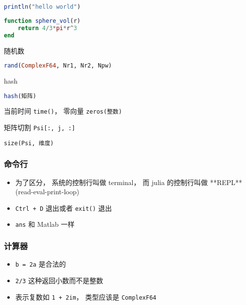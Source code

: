 
\begin{issues}
\issueDraft
\end{issues}

\begin{lstlisting}[language=julia]
println("hello world")
\end{lstlisting}

\begin{lstlisting}[language=julia]
function sphere_vol(r)
    return 4/3*pi*r^3
end
\end{lstlisting}

随机数
\begin{lstlisting}[language=julia]
rand(ComplexF64, Nr1, Nr2, Npw)
\end{lstlisting}

hash
\begin{lstlisting}[language=julia]
hash(矩阵)
\end{lstlisting}

当前时间 \verb|time()|， 零向量 \verb|zeros(整数)|

矩阵切割 \verb|Psi[:, j, :]|

\verb|size(Psi, 维度)|



\subsubsection{命令行}
\begin{itemize}
\item 为了区分， 系统的控制行叫做 terminal， 而 julia 的控制行叫做 **REPL** (read-eval-print-loop)
\item \verb|Ctrl + D| 退出或者 \verb|exit()| 退出
\item \verb|ans| 和 Matlab 一样
\end{itemize}

\subsubsection{计算器}
\begin{itemize}
\item \verb|b = 2a| 是合法的
\item \verb|2/3| 这种返回小数而不是整数
\item 表示复数如 \verb|1 + 2im|， 类型应该是 \verb|ComplexF64|
\end{itemize}

